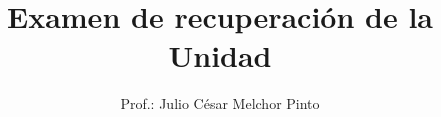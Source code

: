 \documentclass[12pt,addpoints]{evalua}
\title{Examen de {\color{brown}recuperación} de la Unidad}
\author{Prof.: Julio César Melchor Pinto}
\begin{document}
\begin{multicols}{2}
      
      
      
      
\end{multicols}
\begin{questions}








\end{questions}
\end{document}
